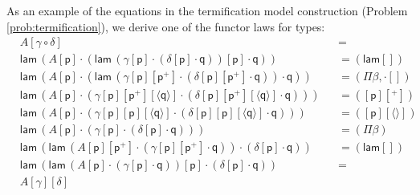 \documentclass[a4paper,UKenglish]{article}
\newcommand{\p}{\mathsf{p}}
\newcommand{\q}{\mathsf{q}}
\newcommand{\lam}{\mathsf{lam}}
\begin{document}
As an example of the equations in the termification model construction
(Problem \ref{prob:termification}), we derive one of the functor laws
for types:
\begin{equation*}
\begin{alignedat}{10}
  & A[\gamma\circ\delta] && {=} \\
  & \lam\,(A[\p]\cdot(\lam\,(\gamma[\p]\cdot(\delta[\p]\cdot\q))[\p]\cdot\q)) && {=}(\lam[]) \\
  & \lam\,(A[\p]\cdot(\lam\,(\gamma[\p][\p^+]\cdot(\delta[\p][\p^+]\cdot\q))\cdot\q)) && {=}(\Pi\beta, {\cdot}[]) \\
  & \lam\,(A[\p]\cdot(\gamma[\p][\p^+][\langle\q\rangle]\cdot(\delta[\p][\p^+][\langle\q\rangle]\cdot\q))) && {=}([\p][^+]) \\
  & \lam\,(A[\p]\cdot(\gamma[\p][\p][\langle\q\rangle]\cdot(\delta[\p][\p][\langle\q\rangle]\cdot\q))) && {=}([\p][\langle\rangle]) \\
  & \lam\,(A[\p]\cdot(\gamma[\p]\cdot(\delta[\p]\cdot\q))) && {=}(\Pi\beta) \\
  & \lam\,(\lam\,(A[\p][\p^+]\cdot(\gamma[\p][\p^+]\cdot\q))\cdot(\delta[\p]\cdot\q))\,\, && {=}(\lam[]) \\
  & \lam\,(\lam\,(A[\p]\cdot(\gamma[\p]\cdot\q))[\p]\cdot(\delta[\p]\cdot\q)) && {=} \\
  & A[\gamma][\delta]
\end{alignedat}
\end{equation*}
\end{document}
